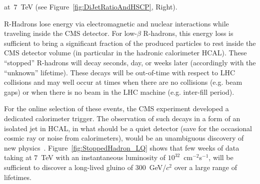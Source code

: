 \documentclass{PoS}
\begin{document}
at~$7$~TeV (see Figure~\ref{fig:DiJetRatioAndHSCP}, Right).
%
%

R-Hadrons lose energy via electromagnetic and nuclear interactions 
while traveling inside the CMS detector. For low-$\beta$ R-hadrons, this energy loss is 
sufficient to bring a significant fraction of the produced particles 
to rest inside the CMS detector volume (in particular in the hadronic calorimeter HCAL). 
These ``stopped'' R-hadrons will decay seconds, day, or weeks later (accordingly with 
the ``unknown'' lifetime). These decays will be out-of-time with respect to LHC collisions 
and may well occur at times when there are no collisions (e.g. beam gaps) or when there is no beam in 
the LHC machine (e.g. inter-fill period).

For the online selection of these events, the CMS experiment 
developed a dedicated calorimeter trigger. The observation of such decays in a form of an isolated jet 
in HCAL, in what should be a quiet detector (save for the occasional cosmic ray or noise from calorimeters), 
would be an unambiguous discovery of new physics~\cite{StoppedGluinoPAS}. Figure~\ref{fig:StoppedHadron_LQ} shows 
that few weeks of data taking at $7$~TeV with an instantaneous luminosity of  $10^{32}$~cm$^{-2}$s$^{-1}$, 
will be sufficient to discover a long-lived gluino of 300~GeV/$c^2$ over a large range of lifetimes.
\end{document}
